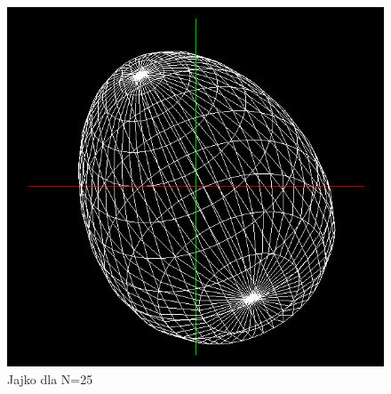\documentclass[wide,a4paper,titlepage,12pt] {article}
\begin{document}
\begin{figure}[htbp]
	 		\begin{center}
         \includegraphics[scale=0.65]{j2.PNG}
      \caption{Jajko dla N=25 }
     \end{center}
     \end{figure}
\newpage
\end{document}
